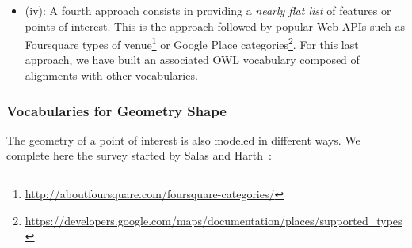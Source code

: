 \begin{itemize}
  \item (iv): A fourth approach consists in providing a \textit{nearly flat list} of features or points of interest. This is the approach followed by popular Web APIs such as Foursquare types of venue\footnote{\url{http://aboutfoursquare.com/foursquare-categories/}} or Google Place categories\footnote{\url{https://developers.google.com/maps/documentation/places/supported_types}}. For this last approach, we have built an associated OWL vocabulary composed of alignments with other vocabularies.
\end{itemize}


\subsubsection{Vocabularies for Geometry Shape}
The geometry of a point of interest is also modeled in different ways. We complete here the survey started by Salas and Harth~\cite{Salas2011}:
